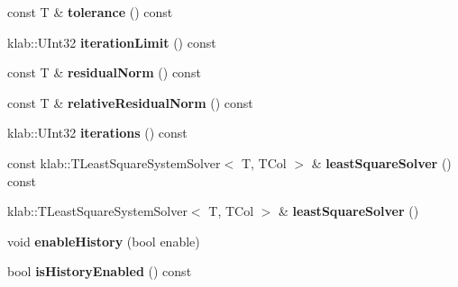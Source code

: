\begin{DoxyCompactItemize}
\item 
const T \& {\bfseries tolerance} () const \hypertarget{classkl1p_1_1TCoSaMPSolver_aeaf202d939eb1f586ed4c898f817a598}{}\label{classkl1p_1_1TCoSaMPSolver_aeaf202d939eb1f586ed4c898f817a598}

\item 
klab\+::\+U\+Int32 {\bfseries iteration\+Limit} () const \hypertarget{classkl1p_1_1TCoSaMPSolver_a155f17114e2d23c7f529a468d4750b40}{}\label{classkl1p_1_1TCoSaMPSolver_a155f17114e2d23c7f529a468d4750b40}

\item 
const T \& {\bfseries residual\+Norm} () const \hypertarget{classkl1p_1_1TCoSaMPSolver_a3267332ec4a6a4ec560998b7739194d1}{}\label{classkl1p_1_1TCoSaMPSolver_a3267332ec4a6a4ec560998b7739194d1}

\item 
const T \& {\bfseries relative\+Residual\+Norm} () const \hypertarget{classkl1p_1_1TCoSaMPSolver_a4ea2c4972f69dac25dfc1bf0e027a7fd}{}\label{classkl1p_1_1TCoSaMPSolver_a4ea2c4972f69dac25dfc1bf0e027a7fd}

\item 
klab\+::\+U\+Int32 {\bfseries iterations} () const \hypertarget{classkl1p_1_1TCoSaMPSolver_ac288ac8b21a7c70fefe5b0b558fa2cac}{}\label{classkl1p_1_1TCoSaMPSolver_ac288ac8b21a7c70fefe5b0b558fa2cac}

\item 
const klab\+::\+T\+Least\+Square\+System\+Solver$<$ T, T\+Col $>$ \& {\bfseries least\+Square\+Solver} () const \hypertarget{classkl1p_1_1TCoSaMPSolver_a56f0439c7e22237da2be7dae79d78b4a}{}\label{classkl1p_1_1TCoSaMPSolver_a56f0439c7e22237da2be7dae79d78b4a}

\item 
klab\+::\+T\+Least\+Square\+System\+Solver$<$ T, T\+Col $>$ \& {\bfseries least\+Square\+Solver} ()\hypertarget{classkl1p_1_1TCoSaMPSolver_a6d08e0013a95a32370a075b504085bb9}{}\label{classkl1p_1_1TCoSaMPSolver_a6d08e0013a95a32370a075b504085bb9}

\item 
void {\bfseries enable\+History} (bool enable)\hypertarget{classkl1p_1_1TCoSaMPSolver_a48a8165faaf2006a723442fcd57031f9}{}\label{classkl1p_1_1TCoSaMPSolver_a48a8165faaf2006a723442fcd57031f9}

\item 
bool {\bfseries is\+History\+Enabled} () const \hypertarget{classkl1p_1_1TCoSaMPSolver_accbfeef13df767458aadcc1f06a2ce22}{}\label{classkl1p_1_1TCoSaMPSolver_accbfeef13df767458aadcc1f06a2ce22}


\end{DoxyCompactItemize}
